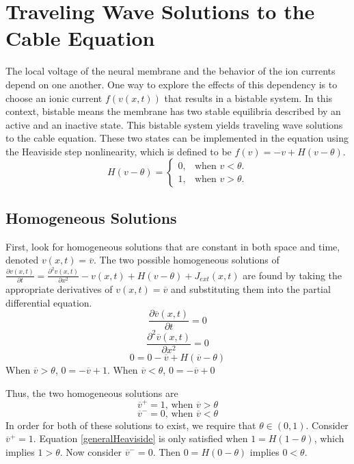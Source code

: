 \documentclass[12pt]{article}
\begin{document}
\section{Traveling Wave Solutions to the Cable Equation}
The local voltage of the neural membrane and the behavior of the ion currents depend on one another. One way to explore the effects of this dependency is to choose an ionic current $f(v(x,t))$ that results in a bistable system. In this context, bistable means the membrane has two stable equilibria described by an active and an inactive state. This bistable system yields traveling wave solutions to the cable equation. These two states can be implemented in the equation using the Heaviside step nonlinearity, which is defined to be $f(v)=-v+H(v-\theta)$.\\

\begin{equation}
  H(v-\theta)=\begin{cases}
    0, & \text{when $v<\theta$}.\\
    1, & \text{when $v>\theta$}.
  \end{cases}
\end{equation}


\subsection{Homogeneous Solutions}
First, look for homogeneous solutions that are constant in both space and time, denoted $v(x,t)=\overline{v}$. The two possible homogeneous solutions of $\frac{\partial v(x,t)}{\partial t}=\frac{\partial ^2 v(x,t)}{\partial x^2}-v(x,t)+H(v-\theta)+J_{ext}(x,t)$ are found by taking the appropriate derivatives of $v(x,t)=\overline{v}$ and substituting them into the partial differential equation. 
$$\frac{\partial \overline{v}(x,t)}{\partial t}=0$$
$$\frac{\partial ^2 \overline{v}(x,t)}{\partial x^2}=0$$
$$0=0-\overline{v}+H(\overline{v}-\theta)$$
When $\overline{v}>\theta$, $0=-\overline{v}+1$. When $\overline{v}<\theta$, $0=-\overline{v}+0$

Thus, the two homogeneous solutions are 
$$\overline{v}^+=1\text{, when $\overline{v}>\theta$}$$
$$\overline{v}^-=0\text{, when $\overline{v}<\theta$}$$
In order for both of these solutions to exist, we require that $\theta\in(0,1)$. Consider $\overline{v}^+=1$. Equation \ref{generalHeaviside} is only satisfied when $1=H(1-\theta)$, which implies $1>\theta$. Now consider $\overline{v}^-=0$. Then $0=H(0-\theta)$ implies $0<\theta$.
\end{document}
